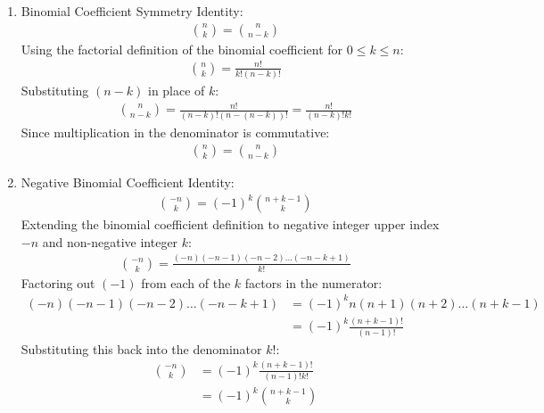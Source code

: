\begin{enumerate}[label=\thesubsection.\arabic*, ref=\thesubsection.\theenumi, itemsep=0.5cm]
Multiplying both sides by $x$ to match the power of $n x^n$:
\begin{align}
\sum_{n=0}^{\infty} n x^n &= \frac{x}{(1 - x)^2}
\end{align}

Finally, substituting back $x = a z^{-1}$ into the derived expression yields the closed-form Z-transform:
\begin{align}
\mathcal{Z}\{n a^n u(n)\} &= \frac{a z^{-1}}{(1 - a z^{-1})^2}
\end{align}

\item Binomial Coefficient Symmetry Identity:
\begin{align}
\binom{n}{k} = \binom{n}{n-k} \label{eq:CS12025-binomial_symmetry}
\end{align}
\solution
Using the factorial definition of the binomial coefficient for $0 \le k \le n$:
\begin{align}
\binom{n}{k} = \frac{n!}{k!(n-k)!}
\end{align}
Substituting $(n-k)$ in place of $k$:
\begin{align}
\binom{n}{n-k} = \frac{n!}{(n-k)!(n - (n-k))!} = \frac{n!}{(n-k)!k!}
\end{align}
Since multiplication in the denominator is commutative:
\begin{align}
\binom{n}{k} = \binom{n}{n-k}
\end{align}

\item Negative Binomial Coefficient Identity:
\begin{align}
\binom{-n}{k} = (-1)^k \binom{n+k-1}{k} \label{eq:CS12025-neg_binomial_coef}
\end{align}
\solution
Extending the binomial coefficient definition to negative integer upper index $-n$ and non-negative integer $k$:
\begin{align}
\binom{-n}{k} = \frac{(-n)(-n-1)(-n-2)\dots(-n-k+1)}{k!}
\end{align}
Factoring out $(-1)$ from each of the $k$ factors in the numerator:
\begin{align}
(-n)(-n-1)(-n-2)\dots(-n-k+1) &= (-1)^k n(n+1)(n+2)\dots(n+k-1) \\
&= (-1)^k \frac{(n+k-1)!}{(n-1)!}
\end{align}
Substituting this back into the denominator $k!$:
\begin{align}
\binom{-n}{k} &= (-1)^k \frac{(n+k-1)!}{(n-1)!k!} \\
&= (-1)^k \binom{n+k-1}{k}
\end{align}


\end{enumerate}
